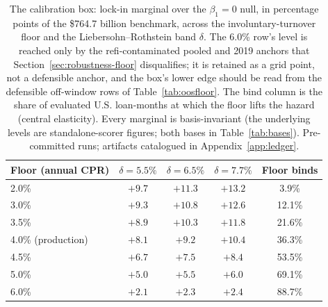 \documentclass[12pt]{article}
\begin{document}
\begin{table}[H]
\centering
\caption{The calibration box: lock-in marginal over the $\beta_1 = 0$ null, in percentage points of the \$764.7 billion benchmark, across the involuntary-turnover floor and the Liebersohn--Rothstein band $\delta$. The 6.0\% row's level is reached only by the refi-contaminated pooled and 2019 anchors that Section~\ref{sec:robustness-floor} disqualifies; it is retained as a grid point, not a defensible anchor, and the box's lower edge should be read from the defensible off-window rows of Table~\ref{tab:oosfloor}. The bind column is the share of evaluated U.S. loan-months at which the floor lifts the hazard (central elasticity). Every marginal is basis-invariant (the underlying levels are standalone-scorer figures; both bases in Table~\ref{tab:bases}). Pre-committed runs; artifacts catalogued in Appendix~\ref{app:ledger}.}
\label{tab:floorband}
\begin{tabular}{lcccc}
\toprule
Floor (annual CPR) & $\delta = 5.5\%$ & $\delta = 6.5\%$ & $\delta = 7.7\%$ & Floor binds \\
\midrule
2.0\% & $+9.7$ & $+11.3$ & $+13.2$ & 3.9\% \\
3.0\% & $+9.3$ & $+10.8$ & $+12.6$ & 12.1\% \\
3.5\% & $+8.9$ & $+10.3$ & $+11.8$ & 21.6\% \\
4.0\% (production) & $+8.1$ & $+9.2$ & $+10.4$ & 36.3\% \\
4.5\% & $+6.7$ & $+7.5$ & $+8.4$ & 53.5\% \\
5.0\% & $+5.0$ & $+5.5$ & $+6.0$ & 69.1\% \\
6.0\% & $+2.1$ & $+2.3$ & $+2.4$ & 88.7\% \\
\bottomrule
\end{tabular}
\end{table}
\end{document}
